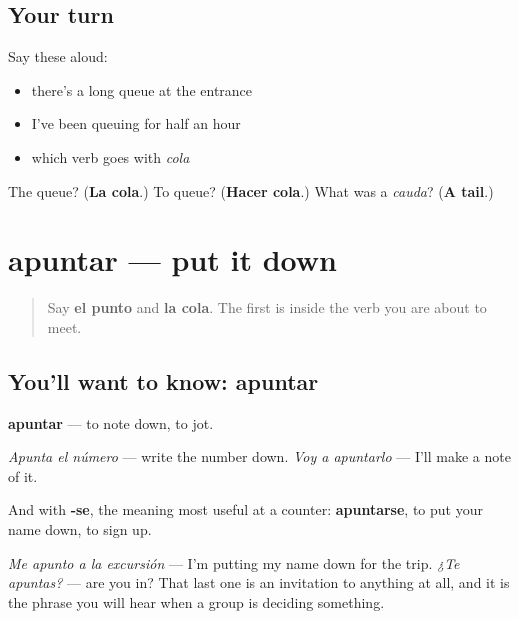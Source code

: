 \subsection*{Your turn}
Say these aloud:

\begin{itemize}
\raggedright
  \item there's a long queue at the entrance
  \item I've been queuing for half an hour
  \item which verb goes with \emph{cola}
\end{itemize}

\begin{tcolorbox}[breakable,colback=teal!4,colframe=teal!35!black,title={Before you move on}]
The queue? (\textbf{La cola}.) To queue? (\textbf{Hacer cola}.) What was a \emph{cauda}? (\textbf{A tail}.)
\end{tcolorbox}
\section[apuntar]{apuntar — put it down}

\label{lesson:ES-C451-apuntar}



\begin{quote}
Say \textbf{el punto} and \textbf{la cola}. The first is inside the verb you are about to meet.
\end{quote}

\subsection*{You'll want to know: apuntar}
\textbf{apuntar} — to note down, to jot.

\emph{Apunta el número} — write the number down. \emph{Voy a apuntarlo} — I'll make a note of it.

And with \textbf{-se}, the meaning most useful at a counter: \textbf{apuntarse}, to put your name down, to sign up.

\emph{Me apunto a la excursión} — I'm putting my name down for the trip. \emph{¿Te apuntas?} — are you in? That last one is an invitation to anything at all, and it is the phrase you will hear when a group is deciding something.

